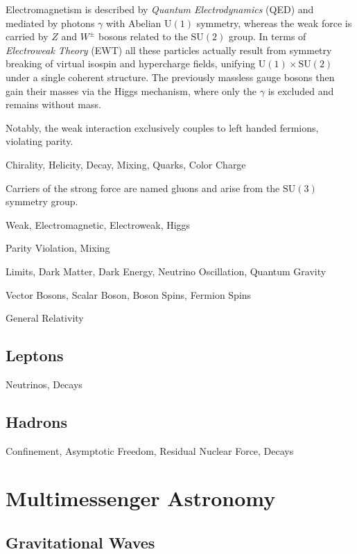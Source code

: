 Electromagnetism is described by \emph{Quantum Electrodynamics} (QED) and mediated by photons $\gamma$ with Abelian $\text{U}(1)$ symmetry,
whereas the weak force is carried by $Z$ and $W^\pm$ bosons related to the $\text{SU}(2)$ group. In terms of \emph{Electroweak Theory} (EWT)
all these particles actually result from symmetry breaking of virtual isospin and hypercharge fields, unifying $\text{U}(1) \times \text{SU}(2)$
under a single coherent structure. The previously massless gauge bosons then gain their masses via the Higgs mechanism, where only the
$\gamma$ is excluded and remains without mass.

\newpage

Notably, the weak interaction exclusively couples to left handed fermions, violating parity.

Chirality, Helicity, Decay, Mixing, Quarks, Color Charge

Carriers of the strong force are named gluons and arise from the $\text{SU}(3)$ symmetry group. 

Weak, Electromagnetic, Electroweak, Higgs

Parity Violation, Mixing

Limits, Dark Matter, Dark Energy, Neutrino Oscillation, Quantum Gravity

Vector Bosons, Scalar Boson, Boson Spins, Fermion Spins

General Relativity

\subsection*{Leptons}
\label{sub:leptons}

Neutrinos, Decays

\subsection*{Hadrons}
\label{sub:hadrons}

Confinement, Asymptotic Freedom, Residual Nuclear Force, Decays

\section{Multimessenger Astronomy}
\label{sec:multimessenger}

\subsection*{Gravitational Waves}
\label{sub:gravitational}


